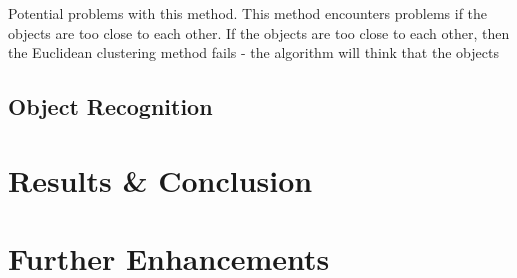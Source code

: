 \documentclass[a4paper]{article}
\begin{document}
Potential problems with this method. This method encounters problems if the objects are too close to each other. If the objects are too close to each other, then the Euclidean clustering method fails - the algorithm will think that the objects 

\subsection{Object Recognition}


\section{Results \& Conclusion}


\section{Further Enhancements}
\end{document}
